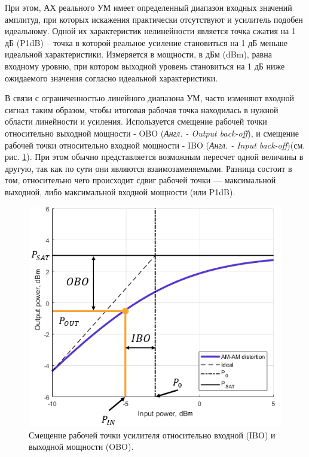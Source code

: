 При этом, АХ реального УМ имеет определенный диапазон входных значений
амплитуд, при которых искажения практически
отсутствуют и усилитель подобен идеальному.
Одной их характеристик нелинейности является точка сжатия на 1 дБ (P1dB) – точка в
которой реальное усиление становиться на 1 дБ меньше идеальной
характеристики. Измеряется в мощности, в дБм (dBm), равна входному уровню,
при котором выходной уровень становиться на 1 дБ ниже ожидаемого значения
согласно идеальной характеристики.


В связи с ограниченностью линейного диапазона УМ, часто изменяют
входной сигнал таким образом, чтобы итоговая рабочая точка находилась в
нужной области линейности и усиления. Используется смещение рабочей точки
относительно выходной мощности - OBO (\textit{Англ. - Output back-off}), и
смещение рабочей точки относительно входной мощности - IBO (\textit{Англ. -
Input back-off})(см. рис. \ref{fig:obo_ibo}). При этом обычно
представляется возможным пересчет одной величины в другую, так как по сути
они являются взаимозаменяемыми. Разница состоит в том, относительно чего
происходит сдвиг рабочей точки — максимальной выходной, либо максимальной
входной мощности (или P1dB).

\begin{figure}[h!]
    \centering
    \includegraphics[width=0.7\linewidth]{figs/pa_obo_ibo.png}
    \caption{Смещение рабочей точки усилителя относительно входной (IBO) и выходной мощности (OBO).}
    \label{fig:obo_ibo}
\end{figure}

